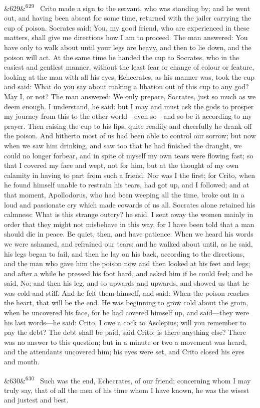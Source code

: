 \documentclass[12pt]{article}
\newcommand{\para}[1][]{\par\noindent\ifx&#1&\else\textsuperscript{\footnotesize #1}~\fi}
\begin{document}
\para[629] Crito made a sign to the servant, who was standing by; and he went out, and having been absent for some time, returned with the jailer carrying the cup of poison. Socrates said: You, my good friend, who are experienced in these matters, shall give me directions how I am to proceed. The man answered: You have only to walk about until your legs are heavy, and then to lie down, and the poison will act. At the same time he handed the cup to Socrates, who in the easiest and gentlest manner, without the least fear or change of colour or feature, looking at the man with all his eyes, Echecrates, as his manner was, took the cup and said: What do you say about making a libation out of this cup to any god? May I, or not? The man answered: We only prepare, Socrates, just so much as we deem enough. I understand, he said: but I may and must ask the gods to prosper my journey from this to the other world---even so---and so be it according to my prayer. Then raising the cup to his lips, quite readily and cheerfully he drank off the poison. And hitherto most of us had been able to control our sorrow; but now when we saw him drinking, and saw too that he had finished the draught, we could no longer forbear, and in spite of myself my own tears were flowing fast; so that I covered my face and wept, not for him, but at the thought of my own calamity in having to part from such a friend. Nor was I the first; for Crito, when he found himself unable to restrain his tears, had got up, and I followed; and at that moment, Apollodorus, who had been weeping all the time, broke out in a loud and passionate cry which made cowards of us all. Socrates alone retained his calmness: What is this strange outcry? he said. I sent away the women mainly in order that they might not misbehave in this way, for I have been told that a man should die in peace. Be quiet, then, and have patience. When we heard his words we were ashamed, and refrained our tears; and he walked about until, as he said, his legs began to fail, and then he lay on his back, according to the directions, and the man who gave him the poison now and then looked at his feet and legs; and after a while he pressed his foot hard, and asked him if he could feel; and he said, No; and then his leg, and so upwards and upwards, and showed us that he was cold and stiff. And he felt them himself, and said: When the poison reaches the heart, that will be the end. He was beginning to grow cold about the groin, when he uncovered his face, for he had covered himself up, and said---they were his last words---he said: Crito, I owe a cock to Asclepius; will you remember to pay the debt? The debt shall be paid, said Crito; is there anything else? There was no answer to this question; but in a minute or two a movement was heard, and the attendants uncovered him; his eyes were set, and Crito closed his eyes and mouth.

\para[630] Such was the end, Echecrates, of our friend; concerning whom I may truly say, that of all the men of his time whom I have known, he was the wisest and justest and best.
\end{document}
